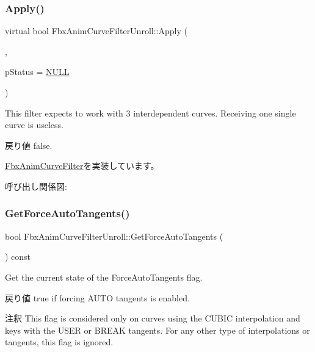 \subsubsection{\texorpdfstring{Apply()}{Apply()}\hspace{0.1cm}{\footnotesize\ttfamily [5/5]}}
{\footnotesize\ttfamily virtual bool Fbx\+Anim\+Curve\+Filter\+Unroll\+::\+Apply (\begin{DoxyParamCaption}\item[{\hyperlink{class_fbx_anim_curve}{Fbx\+Anim\+Curve} \&}]{,  }\item[{\hyperlink{class_fbx_status}{Fbx\+Status} $\ast$}]{p\+Status = {\ttfamily \hyperlink{fbxarch_8h_a070d2ce7b6bb7e5c05602aa8c308d0c4}{N\+U\+LL}} }\end{DoxyParamCaption})\hspace{0.3cm}{\ttfamily [virtual]}}

This filter expects to work with 3 interdependent curves. Receiving one single curve is useless. \begin{DoxyReturn}{戻り値}
{\ttfamily false}. 
\end{DoxyReturn}


\hyperlink{class_fbx_anim_curve_filter_a6a69996c47c0e6f63a0f8b0d5fa806a0}{Fbx\+Anim\+Curve\+Filter}を実装しています。

呼び出し関係図\+:
\mbox{\label{class_fbx_anim_curve_filter_unroll_a0d60638cd87eb0848e7995a42832fca4}} 
\subsubsection{\texorpdfstring{Get\+Force\+Auto\+Tangents()}{GetForceAutoTangents()}}
{\footnotesize\ttfamily bool Fbx\+Anim\+Curve\+Filter\+Unroll\+::\+Get\+Force\+Auto\+Tangents (\begin{DoxyParamCaption}{ }\end{DoxyParamCaption}) const}

Get the current state of the Force\+Auto\+Tangents flag. \begin{DoxyReturn}{戻り値}
{\ttfamily true} if forcing A\+U\+TO tangents is enabled. 
\end{DoxyReturn}
\begin{DoxyRemark}{注釈}
This flag is considered only on curves using the C\+U\+B\+IC interpolation and keys with the U\+S\+ER or B\+R\+E\+AK tangents. For any other type of interpolations or tangents, this flag is ignored. 
\end{DoxyRemark}
\mbox{\label{class_fbx_anim_curve_filter_unroll_a01282004cc60febeff844d9c44f94e5c}} 

